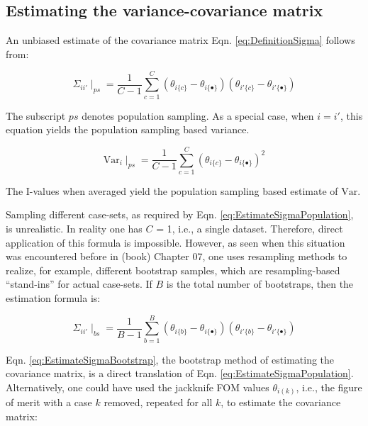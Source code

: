 \documentclass[
]{book}
\begin{document}
\hypertarget{or-method-intro-elementary-stats-est-cov-matrix}{%
\subsection{Estimating the variance-covariance matrix}\label{or-method-intro-elementary-stats-est-cov-matrix}}

An unbiased estimate of the covariance matrix Eqn. \eqref{eq:DefinitionSigma} follows from:

\begin{equation}
\Sigma_{ii'}\mid_{ps}=\frac{1}{C-1}\sum_{c=1}^{C} \left ( \theta_{i\{c\}} - \theta_{i\{\bullet\}} \right) \left ( \theta_{i'\{c\}} - \theta_{i'\{\bullet\}} \right)
\label{eq:EstimateSigmaPopulation}
\end{equation}

The subscript \(ps\) denotes population sampling. As a special case, when \(i = i'\), this equation yields the population sampling based variance.

\begin{equation}
\text{Var}_{i}\mid_{ps}=\frac{1}{C-1}\sum_{c=1}^{C} \left ( \theta_{i\{c\}} - \theta_{i\{\bullet\}} \right)^2
\label{eq:EstimateVarPopulation}
\end{equation}

The I-values when averaged yield the population sampling based estimate of \(\text{Var}\).

Sampling different case-sets, as required by Eqn. \eqref{eq:EstimateSigmaPopulation}, is unrealistic. In reality one has \(C\) = 1, i.e., a single dataset. Therefore, direct application of this formula is impossible. However, as seen when this situation was encountered before in (book) Chapter 07, one uses resampling methods to realize, for example, different bootstrap samples, which are resampling-based ``stand-ins'' for actual case-sets. If \(B\) is the total number of bootstraps, then the estimation formula is:

\begin{equation}
\Sigma_{ii'}\mid_{bs} =\frac{1}{B-1}\sum_{b=1}^{B} \left ( \theta_{i\{b\}} - \theta_{i\{\bullet\}} \right) \left ( \theta_{i'\{b\}} - \theta_{i'\{\bullet\}} \right)
\label{eq:EstimateSigmaBootstrap}
\end{equation}

Eqn. \eqref{eq:EstimateSigmaBootstrap}, the bootstrap method of estimating the covariance matrix, is a direct translation of Eqn. \eqref{eq:EstimateSigmaPopulation}. Alternatively, one could have used the jackknife FOM values \(\theta_{i(k)}\), i.e., the figure of merit with a case \(k\) removed, repeated for all \(k\), to estimate the covariance matrix:
\end{document}
